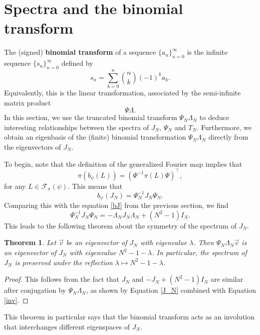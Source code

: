 \documentclass[11pt]{amsart}
\theoremstyle{plain}
\newtheorem{theorem}{Theorem}[section]
\theoremstyle{named}
\newcommand{\vocab}[1]{\textbf{#1}}
\begin{document}
\section{Spectra and the binomial transform}
The (signed) \vocab{binomial transform} of a sequence $\{a_n\}_{n=0}^\infty$ is the infinite sequence $\{s_n\}_{n=0}^\infty$ defined by
$$s_n = \sum_{k=0}^n\binom{n}{k}(-1)^k a_k.$$
Equivalently, this is the linear transformation, associated by the semi-infinite matrix product
$$\Psi\Lambda.$$
In this section, we use the truncated binomial transform $\Psi_N\Lambda_N$ to deduce interesting relationships between the spectra of $J_N$, $\Psi_N$ and $T_N$. 
Furthermore,
we obtain an eigenbasis of the (finite) binomial transformation $\Psi_N\Lambda_N$ directly from the eigenvectors of $J_N$.

To begin, note that the definition of the generalized Fourier map implies that $$\pi(b_\psi(L)) = (\Psi^{-1}\pi(L)\Psi)^\intercal,$$
for any $L\in \mathcal F_x(\psi)$.
This means that
$$b_\psi(J_N) = \Psi_N^{-1}J_N\Psi_N.$$
Comparing this with the equation \eqref{bJ} from the previous section, we find
\begin{equation}\label{J_N}
    \Psi_N^{-1}J_N\Psi_N = -\Lambda_N J_N \Lambda_N + (N^2-1)I_N.
\end{equation}
This leads to the following theorem about the symmetry of the spectrum of $J_N$.
\begin{theorem}\label{T-reflection}
Let $\vec v$ be an eigenvector of $J_N$ with eigenvalue $\lambda$.
Then $\Psi_N\Lambda_N\vec v$ is an eigenvector of $J_N$ with eigenvalue $N^2-1-\lambda$.
In particular, the spectrum of $J_N$ is preserved under the reflection $\lambda\mapsto N^2-1-\lambda$.
\end{theorem}
\begin{proof}
This follows from the fact that $J_N$ and $-J_N+(N^2-1)I_N$ are similar after conjugation by $\Psi_N\Lambda_N$, as shown by Equation \eqref{J_N} combined with Equation \eqref{inv}.
\end{proof}
This theorem in particular says that the binomial transform %
 acts as an involution that interchanges different eigenspaces of $J_N$.
\end{document}
